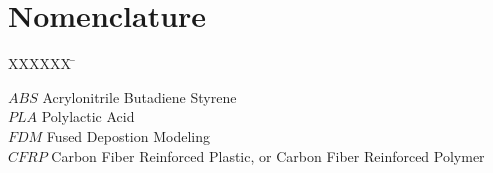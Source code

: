 \section*{Nomenclature}

\begin{tabbing}

  XXXXXX \= \kill%

  $ABS$ \> Acrylonitrile Butadiene Styrene\\
  $PLA$ \> Polylactic Acid\\
  $FDM$ \> Fused Depostion Modeling\\
  $CFRP$ \> Carbon Fiber Reinforced Plastic, or Carbon Fiber Reinforced Polymer\\
  
\end{tabbing}
